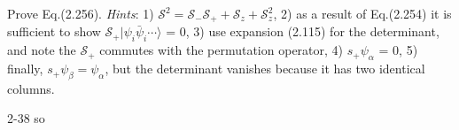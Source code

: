 \documentclass[a4paper]{book}
\newcounter{exercise}[chapter]
\newcounter{solution}[chapter]
\begin{document}
	\begin{exercise}
	Prove Eq.(2.256). {\it Hints}: 1) $\mathscr{S}^2 = \mathscr{S}_- \mathscr{S}_+ + \mathscr{S}_z + \mathscr{S}^2_z$,  2) as a result of Eq.(2.254) it is sufficient to show $\mathscr{S}_+ | \psi_i \bar{\psi}_i \cdots \rangle$ = 0, 3) use expansion (2.115) for the determinant, and note the $\mathscr{S}_+$ commutes with the permutation operator, 4) $s_+ \psi_\alpha $ = 0, 5) finally, $s_+ \psi_\beta = \psi_\alpha $, but the determinant vanishes because it has two identical columns.
	\end{exercise}
	
	\begin{solution}
		2-38 so
	\end{solution}
\end{document}
